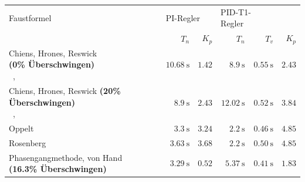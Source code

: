 \begin{longtable}{p{50mm}rrrrr}
    \toprule


    Faustformel
    &
    \multicolumn{2}{l}{PI-Regler}
    &
    \multicolumn{2}{l}{PID-T1-Regler}
    \\

    &
    $T_n$
    &
    $K_p$
    &
    $T_n$
    &
    $T_v$
    &
    $K_p$
    \\

    \midrule

    \endhead
    \endfoot
    \endlastfoot


    \pbox{45mm}{Chiens, Hrones, Reswick \\ \small{\textbf{(0\% \"Uberschwingen)}} \\~\cite{ref:chiens_tsn},~\cite{ref:chiens_wiki}}
    &
    $\SI{10.68}{\second}$
    &
    $1.42$
    &
    $\SI{8.9}{\second}$
    &
    $\SI{0.55}{\second}$
    &
    $2.43$
    \\

    \addlinespace[1em]

    \pbox{45mm}{Chiens, Hrones, Reswick \small{\textbf{(20\% \"Uberschwingen)}} \\~\cite{ref:chiens_tsn},~\cite{ref:chiens_wiki}}
    &
    $\SI{8.9}{\second}$
    &
    $2.43$
    &
    $\SI{12.02}{\second}$
    &
    $\SI{0.52}{\second}$
    &
    $3.84$
    \\

    \addlinespace[1em]

    Oppelt~\cite{ref:op_ros_zieg}
    &
    $\SI{3.3}{\second}$
    &
    $3.24$
    &
    $\SI{2.2}{\second}$
    &
    $\SI{0.46}{\second}$
    &
    $4.85$
    \\

    \addlinespace[1em]

    Rosenberg~\cite{ref:op_ros_zieg}
    &
    $\SI{3.63}{\second}$
    &
    $3.68$
    &
    $\SI{2.2}{\second}$
    &
    $\SI{0.50}{\second}$
    &
    $4.85$
    \\

    \addlinespace[1em]


    \pbox{70mm}{Phasengangmethode, \small{von Hand} \\ \small{\textbf{(16.3\% \"Uberschwingen)}} \\}
    &
    $\SI{3.29}{\second}$
    &
    $0.52$
    &
    $\SI{5.37}{\second}$
    &
    $\SI{0.41}{\second}$
    &
    $1.83$
    \\


\end{longtable}
